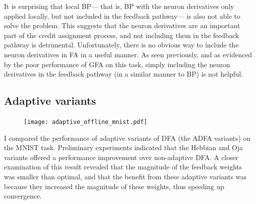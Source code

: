 It is surprising that local BP---%
that is, BP with the neuron derivatives only applied locally,
but not included in the feedback pathway---%
is also not able to solve the problem.
This suggests that the neuron derivatives are an important part
of the credit assignment process,
and not including them in the feedback pathway is detrimental.
Unfortunately, there is no obvious way to include the neuron derivatives
in FA in a useful manner.
As seen previously, and as evidenced by the poor performance of GFA on this task,
simply including the neuron derivatives in the feedback pathway (in a similar manner to BP)
is not helpful.


\subsection{Adaptive variants}

\begin{figure}
  \centering
  \texttt{[image: adaptive\_offline\_mnist.pdf]}
\end{figure}

I compared the performance of adaptive variants of DFA (the ADFA variants)
on the MNIST task.
Preliminary experiments indicated that the Hebbian and Oja variants
offered a performance improvement over non-adaptive DFA.
A closer examination of this result
revealed that the magnitude of the feedback weights
was smaller than optimal,
and that the benefit from these adaptive variants
was because they increased the magnitude of these weights,
thus speeding up convergence.

